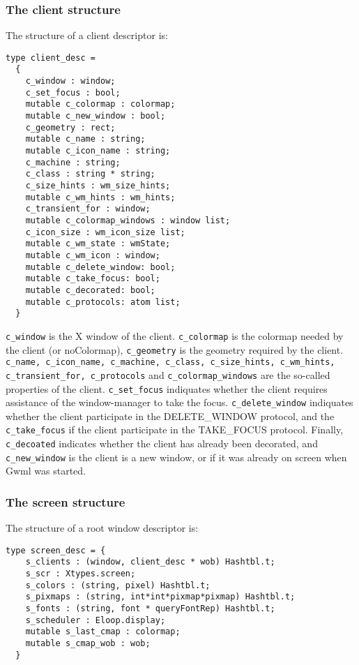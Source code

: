 \documentclass{book}
\begin{document}
\subsubsection{The client structure}

  The structure of a client descriptor is:
\begin{verbatim}
type client_desc =
  { 
    c_window : window;
    c_set_focus : bool; 
    mutable c_colormap : colormap;
    mutable c_new_window : bool;
    c_geometry : rect;    
    mutable c_name : string;
    mutable c_icon_name : string;
    c_machine : string;
    c_class : string * string;
    c_size_hints : wm_size_hints;
    mutable c_wm_hints : wm_hints;
    c_transient_for : window;
    mutable c_colormap_windows : window list;
    c_icon_size : wm_icon_size list;
    mutable c_wm_state : wmState;
    mutable c_wm_icon : window;
    mutable c_delete_window: bool;
    mutable c_take_focus: bool;
    mutable c_decorated: bool;
    mutable c_protocols: atom list;
  }
\end{verbatim}

 {\tt c\_window} is the X window of the client. {\tt c\_colormap} is the
colormap needed by the client (or noColormap), {\tt c\_geometry} is the
geometry required by the client. {\tt c\_name, c\_icon\_name, c\_machine,
c\_class, c\_size\_hints, c\_wm\_hints, c\_transient\_for, c\_protocols}
and {\tt c\_colormap\_windows} are the so-called properties of the client.
{\tt c\_set\_focus} indiquates whether the client requires assistance of the
window-manager to take the focus. {\tt c\_delete\_window} indiquates 
whether the client participate in the DELETE\_WINDOW protocol, and the
{\tt c\_take\_focus} if the client participate in the TAKE\_FOCUS protocol.
Finally, {\tt c\_decoated} indicates whether the client has already been 
decorated, and {\tt c\_new\_window} is the client is a new window, or if 
it was already on screen when Gwml was started.

\subsubsection{The screen structure}

  The structure of a root window descriptor is:
\begin{verbatim} 
type screen_desc = {
    s_clients : (window, client_desc * wob) Hashtbl.t; 
    s_scr : Xtypes.screen;
    s_colors : (string, pixel) Hashtbl.t;
    s_pixmaps : (string, int*int*pixmap*pixmap) Hashtbl.t;
    s_fonts : (string, font * queryFontRep) Hashtbl.t;
    s_scheduler : Eloop.display;    
    mutable s_last_cmap : colormap;    
    mutable s_cmap_wob : wob;
  }
\end{verbatim}
 
\end{document}
